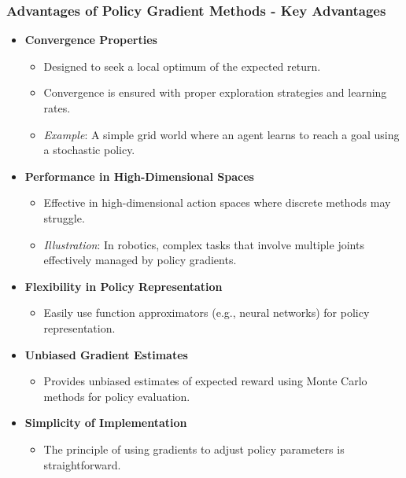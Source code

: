 \documentclass[aspectratio=169]{beamer}
\begin{document}
\begin{frame}[fragile]
    \frametitle{Advantages of Policy Gradient Methods - Key Advantages}
    \begin{itemize}
        \item \textbf{Convergence Properties}
        \begin{itemize}
            \item Designed to seek a local optimum of the expected return.
            \item Convergence is ensured with proper exploration strategies and learning rates.
            \item \textit{Example}: A simple grid world where an agent learns to reach a goal using a stochastic policy.
        \end{itemize}

        \item \textbf{Performance in High-Dimensional Spaces}
        \begin{itemize}
            \item Effective in high-dimensional action spaces where discrete methods may struggle.
            \item \textit{Illustration}: In robotics, complex tasks that involve multiple joints effectively managed by policy gradients.
        \end{itemize}

        \item \textbf{Flexibility in Policy Representation}
        \begin{itemize}
            \item Easily use function approximators (e.g., neural networks) for policy representation.
        \end{itemize}
        
        \item \textbf{Unbiased Gradient Estimates}
        \begin{itemize}
            \item Provides unbiased estimates of expected reward using Monte Carlo methods for policy evaluation.
        \end{itemize}

        \item \textbf{Simplicity of Implementation}
        \begin{itemize}
            \item The principle of using gradients to adjust policy parameters is straightforward.
        \end{itemize}
    \end{itemize}
\end{frame}
\end{document}
